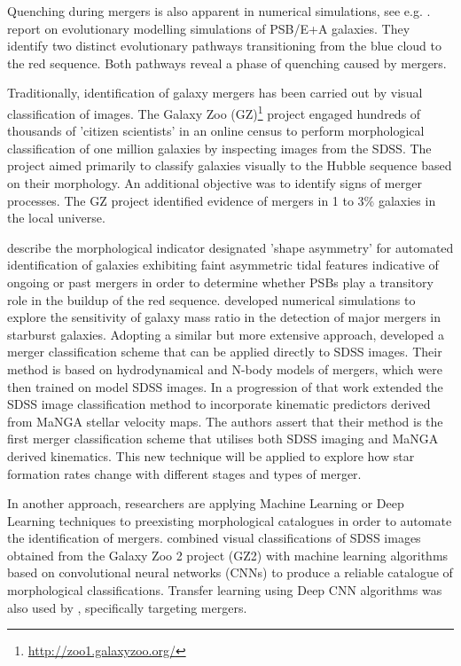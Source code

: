 Quenching during mergers is also apparent in numerical simulations, see e.g. \cite{2019MNRAS.484.2447D}. \citet{2019NatAs...3..440P} report on evolutionary modelling simulations of PSB/E+A galaxies. They identify two distinct evolutionary pathways transitioning from the blue cloud to the red sequence. Both pathways reveal a phase of quenching caused by mergers.

Traditionally, identification of galaxy mergers has been carried out by visual classification of images. The Galaxy Zoo (GZ)\footnote{\href{http://zoo1.galaxyzoo.org/}{http://zoo1.galaxyzoo.org/}} project \citet{10.1111/j.1365-2966.2008.13689.x,10.1111/j.1365-2966.2010.17432.x, 2017MNRAS.464.4176W} engaged hundreds of thousands of 'citizen scientists' in an online census to perform morphological classification of one million galaxies by inspecting images from the SDSS. The project aimed primarily to classify galaxies visually to the Hubble sequence based on their morphology. An additional objective was to identify signs of merger processes. The GZ project identified evidence of mergers in 1 to 3\% galaxies in the local universe.

\cite{2016MNRAS.456.3032P} describe the morphological indicator designated 'shape asymmetry' for automated identification of galaxies exhibiting faint asymmetric tidal features indicative of ongoing or past mergers in order to determine whether PSBs play a transitory role in the buildup of the red sequence. \cite{2011arXiv1102.0550B} developed numerical simulations to explore the sensitivity of galaxy mass ratio in the detection of major mergers in starburst galaxies. Adopting a similar but more extensive approach, \cite{2019ApJ...872...76N} developed a merger classification scheme that can be applied directly to SDSS images. Their method is based on hydrodynamical and N-body models of mergers, which were then trained on model SDSS images. In a progression of that work  \cite{2019DDA....5020304N} extended the SDSS image classification method to incorporate kinematic predictors derived from MaNGA stellar velocity maps. The authors assert that their method is the first merger classification scheme that utilises both SDSS imaging and MaNGA derived kinematics. This new technique will be applied to explore how star formation rates change with different stages and types of merger. 

In another approach, researchers are applying Machine Learning or Deep Learning techniques to preexisting morphological catalogues in order to automate the identification of mergers. \citet{2018MNRAS.476.3661D} combined visual classifications of SDSS images obtained from the Galaxy Zoo 2 project (GZ2) with machine learning algorithms based on convolutional neural networks (CNNs) to produce a reliable catalogue of morphological classifications. Transfer learning using Deep CNN algorithms was also used by \citet{2018MNRAS.479..415A}, specifically targeting mergers. 

